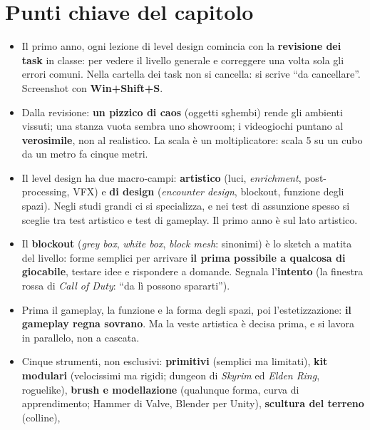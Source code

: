 \section*{Punti chiave del capitolo}

\begin{itemize}
  \item Il primo anno, ogni lezione di level design comincia con la
        \textbf{revisione dei task} in classe: per vedere il livello generale
        e correggere una volta sola gli errori comuni. Nella cartella dei task
        non si cancella: si scrive ``da cancellare''. Screenshot con
        \textbf{Win+Shift+S}.
  \item Dalla revisione: \textbf{un pizzico di caos} (oggetti sghembi) rende
        gli ambienti vissuti; una stanza vuota sembra uno showroom; i
        videogiochi puntano al \textbf{verosimile}, non al realistico. La scala
        è un moltiplicatore: scala 5 su un cubo da un metro fa cinque metri.
  \item Il level design ha due macro-campi: \textbf{artistico} (luci,
        \emph{enrichment}, post-processing, VFX) e \textbf{di design}
        (\emph{encounter design}, blockout, funzione degli spazi). Negli studi
        grandi ci si specializza, e nei test di assunzione spesso si sceglie
        tra test artistico e test di gameplay. Il primo anno è sul lato
        artistico.
  \item Il \textbf{blockout} (\emph{grey box}, \emph{white box}, \emph{block
        mesh}: sinonimi) è lo sketch a matita del livello: forme semplici per
        arrivare \textbf{il prima possibile a qualcosa di giocabile}, testare
        idee e rispondere a domande. Segnala l'\textbf{intento} (la finestra
        rossa di \emph{Call of Duty}: ``da lì possono spararti'').
  \item Prima il gameplay, la funzione e la forma degli spazi, poi
        l'estetizzazione: \textbf{il gameplay regna sovrano}. Ma la veste
        artistica è decisa prima, e si lavora in parallelo, non a cascata.
  \item Cinque strumenti, non esclusivi: \textbf{primitivi} (semplici ma
        limitati), \textbf{kit modulari} (velocissimi ma rigidi; dungeon di
        \emph{Skyrim} ed \emph{Elden Ring}, roguelike), \textbf{brush e
        modellazione} (qualunque forma, curva di apprendimento; Hammer di
        Valve, Blender per Unity), \textbf{scultura del terreno} (colline),

\end{itemize}
